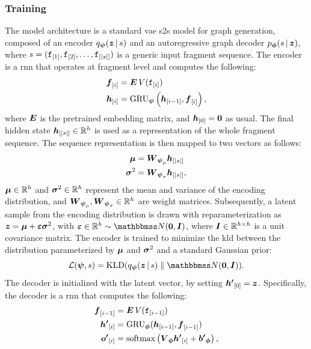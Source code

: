 \subsubsection*{Training}
The model architecture is a standard \gls{vae} \gls{s2s} model for graph generation, composed of an encoder $\Encoder(\Vector{z} \given s)$ and an autoregressive graph decoder $\Decoder(s \given \Vector{z})$, where $s = (\mathtt{f}_{[1]}, \mathtt{f}_{[2]}, \ldots, \mathtt{f}_{[|s|]})$ is a generic input fragment sequence. The encoder is a \gls{rnn} that operates at fragment level and computes the following:
\begin{align*}
    \Elem{f}{i} &= \Matrix{E}\, V(\Graph{f}_{[i]})\\
    \Elem{h}{i} &= \Op{GRU}_{\EncParam}\Par{\Elem{h}{i-1}, \Elem{f}{i}},
\end{align*}
where $\Matrix{E}$ is the pretrained embedding matrix, and $\Elem{h}{0} = \Zeros$ as usual. The final hidden state $\Elem{h}{|s|} \in \Real^h$ is used as a representation of the whole fragment sequence. The sequence representation is then mapped to two vectors as follows:
\begin{align*}
    \MeanVec &= \Matrix{W}_{\EncParam_\mu} \Elem{h}{|s|}\\
    \StdVec &= \Matrix{W}_{\EncParam_\sigma} \Elem{h}{|s|},
\end{align*}
$\boldsymbol{\mu} \in \mathbb{R}^h$ and $\boldsymbol{\sigma}^2 \in \mathbb{R}^h$ represent the mean and variance of the encoding distribution, and $\Matrix{W}_{\EncParam_\mu}, \Matrix{W}_{\EncParam_\sigma} \in \Real^h$ are weight matrices. Subsequently, a latent sample from the encoding distribution is drawn with reparameterization as $\Vector{z} = \MeanVec + \boldsymbol{\eps} \StdVec$, with $\boldsymbol{\eps} \in \Real^h \sim \Normal{\Zeros}{\Identity}$, where $\Identity \in \Real^{h \times h}$ is a unit covariance matrix. The encoder is trained to minimize the \gls{kld} between the distribution parameterized by $\boldsymbol{\mu}$ and $\boldsymbol{\sigma}^2$ and a standard Gaussian prior:
$$\Loss(\EncParam, s) = \KLD{\Encoder(\Vector{z} \given s)}{\Normal{\Zeros}{\Identity}}.$$
The decoder is initialized with the latent vector, \ie by setting $\Elem{h'}{0} = \Vector{z}$. Specifically, the decoder is a \gls{rnn} that computes the following:
\begin{align*}
    \Elem{f}{i-1} &= \Matrix{E}\, V(\Graph{f}_{[i-1]})\\
    \Elem{h'}{i} &= \Op{GRU}_{\DecParam}(\Elem{h}{i-1}, \Elem{f}{i-1})\\
    \Elem{o'}{i} &= \softmax\Par{\Matrix{V}_{\DecParam}\Elem{h'}{i} + \Vector{b'}_{\DecParam}},
\end{align*}
